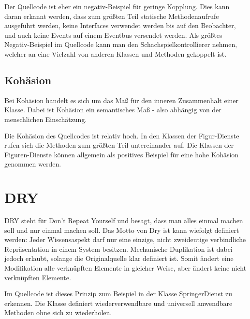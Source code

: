 Der Quellcode ist eher ein negativ-Beispiel für geringe Kopplung. Dies kann daran erkannt werden, dass zum größten Teil statische Methodenaufrufe ausgeführt werden, keine Interfaces verwendet werden bis auf den Beobachter, und auch keine Events auf einem Eventbus versendet werden. Als größtes Negativ-Beispiel im Quellcode kann man den Schachspielkontrollierer nehmen, welcher an eine Vielzahl von anderen Klassen und Methoden gekoppelt ist.

\subsection{Kohäsion}
Bei Kohäsion handelt es sich um das Maß für den inneren Zusammenhalt einer Klasse. Dabei ist Kohäsion ein semantisches Maß - also abhängig von der menschlichen Einschätzung.

Die Kohäsion des Quellcodes ist relativ hoch. In den Klassen der Figur-Dienste rufen sich die Methoden zum größten Teil untereinander auf. Die Klassen der Figuren-Dienste können allgemein als positives Beispiel für eine hohe Kohäsion genommen werden.


\section{DRY}

DRY steht für Don't Repeat Yourself und besagt, dass man alles einmal machen soll und nur einmal machen soll. Das Motto von Dry ist kann wiefolgt definiert werden: \glqq{} Jeder Wissensaspekt darf nur eine einzige, nicht zweideutige verbindliche Repräsentation in einem System besitzen\grqq{}. Mechanische Duplikation ist dabei jedoch erlaubt, solange die Originalquelle klar definiert ist. Somit ändert eine Modifikation alle verknüpften Elemente in gleicher Weise, aber ändert keine nicht verknüpften Elemente.

Im Quellcode ist dieses Prinzip zum Beispiel in der Klasse SpringerDienst zu erkennen. Die Klasse definiert wiederverwendbare und universell anwendbare Methoden ohne sich zu wiederholen.